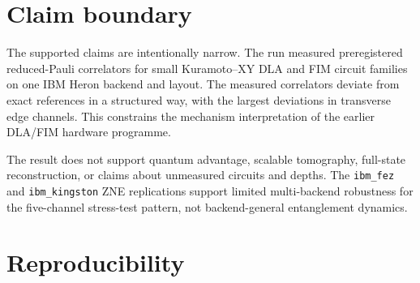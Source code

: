 \documentclass[preprint,aps,physrev,superscriptaddress,floatfix,longbibliography]{revtex4-2}
\begin{document}
\section{Claim boundary}

The supported claims are intentionally narrow. The run measured preregistered
reduced-Pauli correlators for small Kuramoto--XY DLA and FIM circuit families
on one IBM Heron backend and layout. The measured correlators deviate from
exact references in a structured way, with the largest deviations in
transverse edge channels. This constrains the mechanism interpretation of the
earlier DLA/FIM hardware programme.

The result does not support quantum advantage, scalable tomography, full-state
reconstruction, or claims about unmeasured circuits and depths. The
\texttt{ibm\_fez} and \texttt{ibm\_kingston} ZNE replications support limited
multi-backend robustness for the five-channel stress-test pattern, not
backend-general entanglement dynamics.

\section{Reproducibility}
\end{document}
